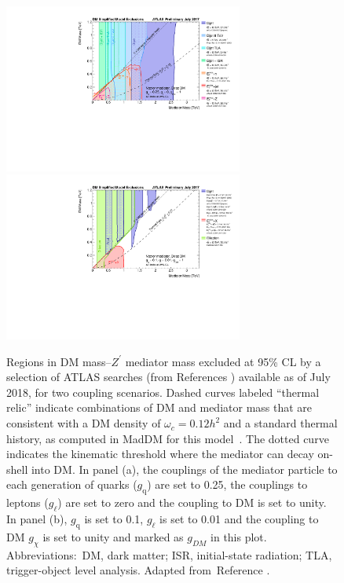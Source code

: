 \documentclass{ar-1col}
\newcommand{\chiDM}{\ensuremath{\chi}\xspace}
\newcommand{\gDM}{\ensuremath{g_{\chiDM}}\xspace}
\newcommand{\gdm}{\gDM}
\newcommand{\gl}{$g_{\ell}$\xspace}
\newcommand{\gq}{$g_{\mathrm{q}}$\xspace}
\newcommand{\Zprime}{\ensuremath{{Z}^\prime}\xspace}
\begin{document}
\clearpage


\begin{figure}[!htpb]
\includegraphics[width=0.7\textwidth]{figs_standalone/ATLAS_DarkMatter_Summary_Vector.pdf}\\
\includegraphics[width=0.7\textwidth]{figs_standalone/ATLAS_DarkMatter_Summary_Vector_ModifiedCoupling.pdf}
\caption{Regions in DM mass--\Zprime mediator mass
excluded at 95\% CL by a selection of ATLAS searches 
(from References \cite{ATLAS:2016bvn,Aaboud:2018fzt,Aaboud:2017yvp,
Aaboud:2017phn,ATLAS-CONF-2018-005,Aaboud:2017bja,Aaboud:2017dor,
Aaboud:2017buh}) 
available as of July 2018, for two coupling scenarios. Dashed curves labeled ``thermal
relic'' indicate combinations of DM and mediator mass
that are consistent with a DM density of $\omega_c = 0.12
h^2$ and a standard thermal history, as computed in MadDM for this
model~\cite{Backovic:2015cra}. The dotted curve indicates the
kinematic threshold where the mediator can decay on-shell into
DM. 
In panel (a), the couplings of the mediator particle to each generation
of quarks (\gq) are set to 0.25, the couplings to leptons (\gl)
are set to zero and the coupling to DM is set to unity. 
In panel (b), \gq is set to 0.1, \gl is set to 0.01
and the coupling to DM \gdm is set to unity and marked as $g_{DM}$ in this plot.
Abbreviations:\ DM, dark matter; ISR, initial-state radiation; 
TLA, trigger-object level analysis. Adapted from~Reference .
}
\label{fig:sensitivityComparison}
\end{figure}
\end{document}
